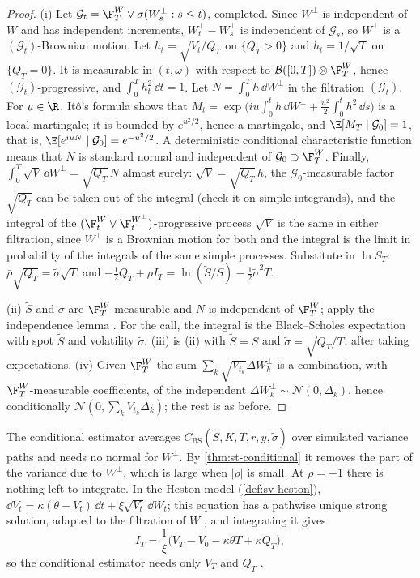 \begin{proof}
(i) Let $\mathcal G_t=\F^W_T\vee\sigma(W^\perp_s:s\le t)$, completed. Since $W^\perp$ is
independent of $W$ and has independent increments, $W^\perp_t-W^\perp_s$ is independent of
$\mathcal G_s$, so $W^\perp$ is a $(\mathcal G_t)$-Brownian motion. Let $h_t=\sqrt{V_t/Q_T}$
on $\{Q_T>0\}$ and $h_t=1/\sqrt T$ on $\{Q_T=0\}$. It is measurable in $(t,\omega)$ with
respect to $\mathcal B([0,T])\otimes\F^W_T$, hence $(\mathcal G_t)$-progressive, and
$\int_0^Th_t^2\,\dd t=1$. Let $N=\int_0^Th\,\dd W^\perp$ in the filtration $(\mathcal G_t)$.
For $u\in\R$, It\^o's formula shows that
$M_t=\exp\big(iu\int_0^th\,\dd W^\perp+\frac{u^2}2\int_0^th^2\,\dd s\big)$ is a local martingale;
it is bounded by $e^{u^2/2}$, hence a martingale, and $\E[M_T\mid\mathcal G_0]=1$, that is,
$\E[e^{iuN}\mid\mathcal G_0]=e^{-u^2/2}$. A deterministic conditional characteristic function
means that $N$ is standard normal and independent of $\mathcal G_0\supset\F^W_T$. Finally,
$\int_0^T\sqrt V\,\dd W^\perp=\sqrt{Q_T}\,N$ almost surely: $\sqrt V=\sqrt{Q_T}\,h$, the
$\mathcal G_0$-measurable factor $\sqrt{Q_T}$ can be taken out of the integral (check it on
simple integrands), and the integral of the $(\F^W_t\vee\F^{W^\perp}_t)$-progressive
process $\sqrt V$ is the same in either filtration, since $W^\perp$ is a Brownian motion for
both and the integral is the limit in probability of the integrals of the same simple
processes. Substitute in $\ln S_T$: $\bar\rho\sqrt{Q_T}=\tilde\sigma\sqrt T$ and
$-\frac12Q_T+\rho I_T=\ln(\tilde S/S)-\frac12\tilde\sigma^2T$.

(ii) $\tilde S$ and $\tilde\sigma$ are $\F^W_T$-measurable and $N$ is independent of
$\F^W_T$; apply the independence lemma \citep[Lemma~2.3.4]{shreve2}. For the call, the
integral is the Black--Scholes expectation with spot $\tilde S$ and volatility
$\tilde\sigma$. (iii) is (ii) with $\tilde S=S$ and $\tilde\sigma=\sqrt{Q_T/T}$, after taking
expectations. (iv) Given $\F^W_T$ the sum $\sum_k\sqrt{V_{t_k}}\Delta W^\perp_k$ is a
combination, with $\F^W_T$-measurable coefficients, of the independent
$\Delta W^\perp_k\sim\mathcal N(0,\Delta_k)$, hence conditionally $\mathcal N(0,\sum_kV_{t_k}\Delta_k)$; the
rest is as before.
\end{proof}

The conditional estimator averages $C_{\mathrm{BS}}(\tilde S,K,T,r,y,\tilde\sigma)$ over
simulated variance paths and needs no normal for $W^\perp$. By \cref{thm:st-conditional} it
removes the part of the variance due to $W^\perp$, which is large when $|\rho|$ is small. At
$\rho=\pm1$ there is nothing left to integrate. In the Heston model (\cref{def:sv-heston}),
$\dd V_t=\kappa(\theta-V_t)\,\dd t+\xi\sqrt{V_t}\,\dd W_t$; this equation has a pathwise
unique strong solution, adapted to the filtration of $W$ \citep[Sections~5.2 and 5.3]{karatzas-shreve},
and integrating it gives
\[
  I_T=\frac1\xi\big(V_T-V_0-\kappa\theta T+\kappa Q_T\big),
\]
so the conditional estimator needs only $V_T$ and $Q_T$ \citep{willard,broadie-kaya}.

